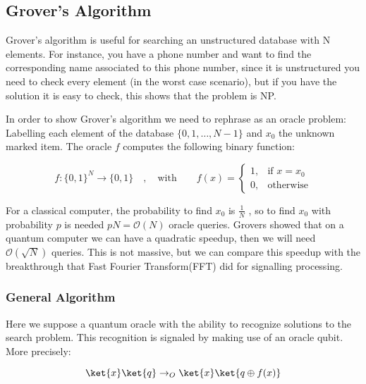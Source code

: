 \subsection{Grover's Algorithm}
\label{subsec: Grover}

Grover's algorithm is useful for searching an unstructured database with N elements. For instance, you have a phone number and want to find the corresponding name associated to this phone number, since it is unstructured you need to check every element (in the worst case scenario), but if you have the solution it is easy to check, this shows that the problem is NP.

In order to show Grover's algorithm we need to rephrase as an oracle problem: Labelling each element of the database $\{0,1, \dots, N-1 \}$ and $x_0$ the unknown marked item. The oracle $f$ computes the following binary function:

\begin{equation}
    f: \{0,1 \}^N \rightarrow \{0,1 \} \hspace{1em} , \hspace{1em} \mathrm{with} \hspace{2em} f(x) = \begin{cases}
    1, & \text{if } x=x_0\\
    0, & \text{otherwise}
\end{cases}
\end{equation}

For a classical computer, the probability to find $x_0$ is $\frac{1}{N}$ , so to find $x_0$ with probability $p$ is needed $p N = \mathcal{O}(N)$ oracle queries. Grovers showed that on a quantum computer we can have a quadratic speedup, then we will need $\mathcal{O}(\sqrt{N})$ queries. This is not massive, but we can compare this speedup with the breakthrough that Fast Fourier Transform(FFT) did for signalling processing.

\subsubsection{General Algorithm}
\label{subsubsec: Grover Algorithm}

Here we suppose a quantum oracle with the ability to recognize solutions to the search problem. This recognition is signaled by making use of an oracle qubit. More precisely:

\begin{equation}
    \ket{x} \ket{q} \rightarrow_O \ket{x} \ket{q \oplus f(x)}
\end{equation}

